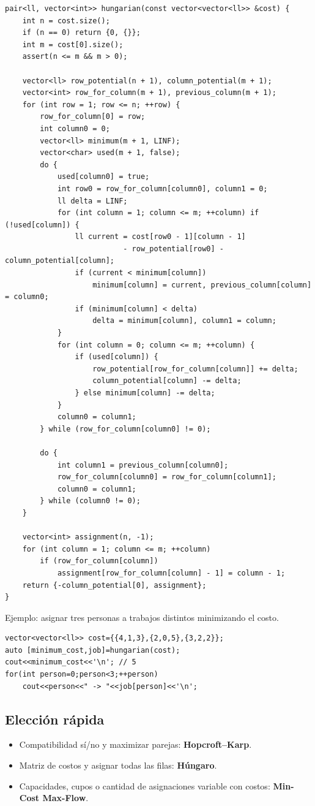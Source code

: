 \begin{lstlisting}[style=cpp]
pair<ll, vector<int>> hungarian(const vector<vector<ll>> &cost) {
    int n = cost.size();
    if (n == 0) return {0, {}};
    int m = cost[0].size();
    assert(n <= m && m > 0);

    vector<ll> row_potential(n + 1), column_potential(m + 1);
    vector<int> row_for_column(m + 1), previous_column(m + 1);
    for (int row = 1; row <= n; ++row) {
        row_for_column[0] = row;
        int column0 = 0;
        vector<ll> minimum(m + 1, LINF);
        vector<char> used(m + 1, false);
        do {
            used[column0] = true;
            int row0 = row_for_column[column0], column1 = 0;
            ll delta = LINF;
            for (int column = 1; column <= m; ++column) if (!used[column]) {
                ll current = cost[row0 - 1][column - 1]
                           - row_potential[row0] - column_potential[column];
                if (current < minimum[column])
                    minimum[column] = current, previous_column[column] = column0;
                if (minimum[column] < delta)
                    delta = minimum[column], column1 = column;
            }
            for (int column = 0; column <= m; ++column) {
                if (used[column]) {
                    row_potential[row_for_column[column]] += delta;
                    column_potential[column] -= delta;
                } else minimum[column] -= delta;
            }
            column0 = column1;
        } while (row_for_column[column0] != 0);

        do {
            int column1 = previous_column[column0];
            row_for_column[column0] = row_for_column[column1];
            column0 = column1;
        } while (column0 != 0);
    }

    vector<int> assignment(n, -1);
    for (int column = 1; column <= m; ++column)
        if (row_for_column[column])
            assignment[row_for_column[column] - 1] = column - 1;
    return {-column_potential[0], assignment};
}
\end{lstlisting}

Ejemplo: asignar tres personas a trabajos distintos minimizando el costo.

\begin{lstlisting}[style=cpp]
vector<vector<ll>> cost={{4,1,3},{2,0,5},{3,2,2}};
auto [minimum_cost,job]=hungarian(cost);
cout<<minimum_cost<<'\n'; // 5
for(int person=0;person<3;++person)
    cout<<person<<" -> "<<job[person]<<'\n';
\end{lstlisting}

\subsection{Elecci\'on r\'apida}

\begin{itemize}
    \item Compatibilidad s\'i/no y maximizar parejas: \textbf{Hopcroft--Karp}.
    \item Matriz de costos y asignar todas las filas: \textbf{H\'ungaro}.
    \item Capacidades, cupos o cantidad de asignaciones variable con costos:
    \textbf{Min-Cost Max-Flow}.
\end{itemize}
